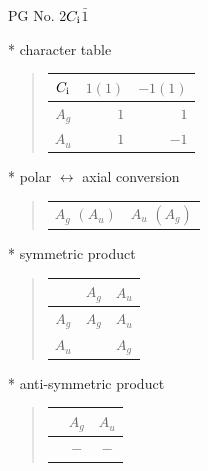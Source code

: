 \documentclass[fleqn,8pt,landscape]{jsarticle}
\begin{document}
\setcounter{MaxMatrixCols}{32}

\renewcommand{\tablename}{Table~}
\renewcommand{\figurename}{Figure~}
\begin{center}
\LARGE
PG No. 2\quad$C_{\rm i}$\quad$\bar{1}$\quad[ triclinic ]
\end{center}

* character table
\begin{quote}
\begin{tabular}{crr} \hline \hline
$ C_{\rm i} $ & $ 1(1) $ & $ -1(1) $ \\ \hline
$ A_{g} $ & $ 1 $ & $ 1 $ \\
$ A_{u} $ & $ 1 $ & $ -1 $ \\
 \hline \hline
\end{tabular}
\end{quote}

* polar $\leftrightarrow$ axial conversion
\begin{quote}
\begin{tabular}{cc}
$ A_{g}\,\,(A_{u}) $ & $ A_{u}\,\,(A_{g}) $
\end{tabular}
\end{quote}

* symmetric product
\begin{quote}
\begin{tabular}{c|cc} \hline \hline
 & $ A_{g} $ & $ A_{u} $ \\ \hline
$ A_{g} $ & $ A_{g} $ & $ A_{u} $ \\
$ A_{u} $ & $  $ & $ A_{g} $ \\
 \hline \hline
\end{tabular}
\end{quote}

* anti-symmetric product
\begin{quote}
\begin{tabular}{ccc} \hline \hline
 & $ A_{g} $ & $ A_{u} $ \\ \hline
$  $ & $ - $ & $ - $ \\
 \hline \hline
\end{tabular}
\end{quote}
\end{document}

